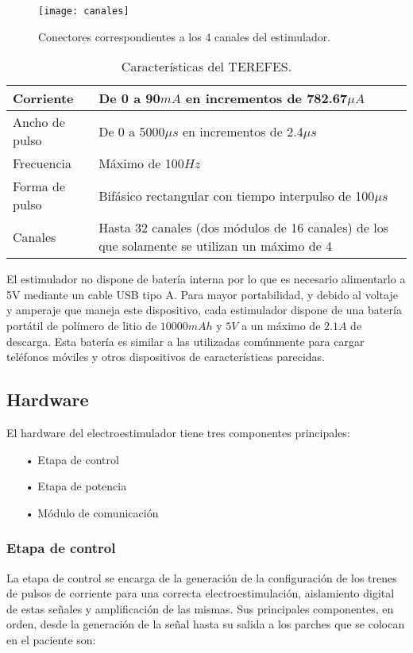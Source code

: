 \begin{figure}[!htb]
\centering
\texttt{[image: canales]}
  \caption{Conectores correspondientes a los 4 canales del estimulador.}\label{fig:canales}
\end{figure}

\begin{table}
\centering
\begin{tabular}{| p{30mm} | p{90 mm} |}
\hline
Corriente & De 0 a 90$mA$ en incrementos de 782.67$\mu A$ \\ \hline
Ancho de pulso & De 0 a 5000$\mu s$ en incrementos de 2.4$\mu s$\\ \hline
Frecuencia & Máximo de 100$Hz$ \\ \hline
Forma de pulso & Bifásico rectangular con tiempo interpulso de 100$\mu s$\\ \hline
Canales & Hasta 32 canales (dos módulos de 16 canales) de los que solamente se utilizan un máximo de 4\\ \hline
\end{tabular}\caption{Características del TEREFES.}\label{tabla:detalles_terefes}
\end{table}

El estimulador no dispone de batería interna por lo que es necesario alimentarlo a 5V mediante un cable USB tipo A. Para mayor portabilidad, y debido al voltaje y amperaje que maneja este dispositivo, cada estimulador dispone de una batería portátil de polímero de litio de $10000mAh$ y $5V$ a un máximo de $2.1A$ de descarga. Esta batería es similar a las utilizadas comúnmente para cargar teléfonos móviles y otros dispositivos de características parecidas.

\subsection{Hardware}
El hardware del electroestimulador tiene tres componentes principales:

\begin{itemize}
\item[•] Etapa de control
\item[•] Etapa de potencia
\item[•] Módulo de comunicación
\end{itemize}

\subsubsection{Etapa de control}
La etapa de control se encarga de la generación de la configuración de los trenes de pulsos de corriente para una correcta electroestimulación, aislamiento digital de estas señales y amplificación de las mismas. Sus principales componentes, en orden, desde la generación de la señal hasta su salida a los parches que se colocan en el paciente son:

